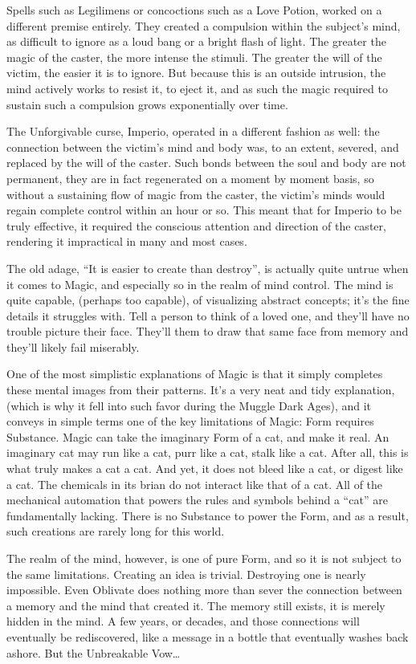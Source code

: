 Spells such as Legilimens or concoctions such as a Love Potion, worked on a different premise entirely. They created a compulsion within the subject’s mind, as difficult to ignore as a loud bang or a bright flash of light. The greater the magic of the caster, the more intense the stimuli. The greater the will of the victim, the easier it is to ignore. But because this is an outside intrusion, the mind actively works to resist it, to eject it, and as such the magic required to sustain such a compulsion grows exponentially over time.

The Unforgivable curse, Imperio, operated in a different fashion as well: the connection between the victim’s mind and body was, to an extent, severed, and replaced by the will of the caster. Such bonds between the soul and body are not permanent, they are in fact regenerated on a moment by moment basis, so without a sustaining flow of magic from the caster, the victim’s minds would regain complete control within an hour or so. This meant that for Imperio to be truly effective, it required the conscious attention and direction of the caster, rendering it impractical in many and most cases.

The old adage, “It is easier to create than destroy”, is actually quite untrue when it comes to Magic, and especially so in the realm of mind control. The mind is quite capable, (perhaps too capable), of visualizing abstract concepts; it’s the fine details it struggles with. Tell a person to think of a loved one, and they’ll have no trouble picture their face. They’ll them to draw that same face from memory and they’ll likely fail miserably.

One of the most simplistic explanations of Magic is that it simply completes these mental images from their patterns. It’s a very neat and tidy explanation, (which is why it fell into such favor during the Muggle Dark Ages), and it conveys in simple terms one of the key limitations of Magic: Form requires Substance. Magic can take the imaginary Form of a cat, and make it real. An imaginary cat may run like a cat, purr like a cat, stalk like a cat. After all, this is what truly makes a cat a cat. And yet, it does not bleed like a cat, or digest like a cat. The chemicals in its brian do not interact like that of a cat. All of the mechanical automation that powers the rules and symbols behind a “cat” are fundamentally lacking. There is no Substance to power the Form, and as a result, such creations are rarely long for this world.

The realm of the mind, however, is one of pure Form, and so it is not subject to the same limitations. Creating an idea is trivial. Destroying one is nearly impossible. Even Oblivate does nothing more than sever the connection between a memory and the mind that created it. The memory still exists, it is merely hidden in the mind. A few years, or decades, and those connections will eventually be rediscovered, like a message in a bottle that eventually washes back ashore. But the Unbreakable Vow…

